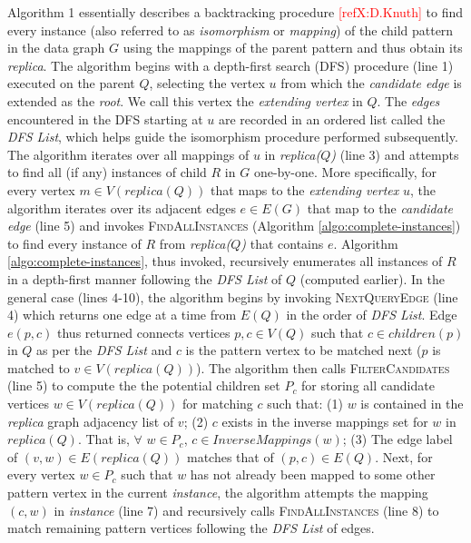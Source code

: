 Algorithm 1 essentially describes a backtracking procedure
\textcolor{red}{[refX:D.Knuth]} to find every instance (also referred to as
\emph{isomorphism} or \emph{mapping}) of the child pattern in the data graph $G$
using the mappings of the parent pattern and thus obtain its \emph{replica}. The
algorithm begins with a depth-first search ({\sf DFS}) procedure (line 1)
executed on the parent $Q$, selecting the vertex $u$ from which the
\emph{candidate edge} is extended as the \emph{root}. We call this vertex the
\textit{extending vertex} in $Q$. The \emph{edges} encountered in the {\sf DFS}
starting at $u$ are recorded in an ordered list called the \emph{DFS List},
which helps guide the isomorphism procedure performed subsequently. The
algorithm iterates over all mappings of $u$ in \emph{replica($Q$)} (line 3) and
attempts to find all (if any) instances of child $R$ in $G$ one-by-one. More
specifically, for every vertex $m \in V(replica(Q))$ that maps to the
\emph{extending vertex} $u$, the algorithm iterates over its adjacent edges $e
\in E(G)$ that map to the \emph{candidate edge} (line 5) and invokes
\textsc{FindAllInstances} (Algorithm \ref{algo:complete-instances}) to find
every instance of $R$ from \emph{replica($Q$)} that contains $e$. Algorithm
\ref{algo:complete-instances}, thus invoked, recursively enumerates all
instances of $R$ in a depth-first manner following the \emph{DFS List} of $Q$
(computed earlier). In the general case (lines 4-10), the algorithm begins by
invoking \textsc{NextQueryEdge} (line 4) which returns one edge at a time from
$E(Q)$ in the order of \emph{DFS List}. Edge $e(p,c)$ thus returned connects
vertices $p,c \in V(Q)$ such that $c\in children(p)$ in $Q$ as per the \emph{DFS
List} and $c$ is the pattern vertex to be matched next ($p$ is matched to $v \in
V(replica(Q))$). The algorithm then calls \textsc{FilterCandidates} (line 5) to
compute the the potential children set $P_c$ for storing all candidate vertices
$w\in V(replica(Q))$ for matching $c$ such that: (1) $w$ is contained in the
\textit{replica} graph adjacency list of $v$; (2) $c$ exists in the inverse
mappings set for $w$ in $replica(Q)$. That is, $\forall$ $w \in P_{c}$, $c\in
InverseMappings(w)$; (3) The edge label of $(v,w)\in E(replica(Q))$ matches that
of $(p,c)\in E(Q)$. Next, for every vertex $w \in P_{c}$ such that $w$ has not
already been mapped to some other pattern vertex in the current
\textit{instance}, the algorithm attempts the mapping $(c,w)$ in
\textit{instance} (line 7) and recursively calls \textsc{FindAllInstances} (line
8) to match remaining pattern vertices following the \textit{DFS List} of edges.

